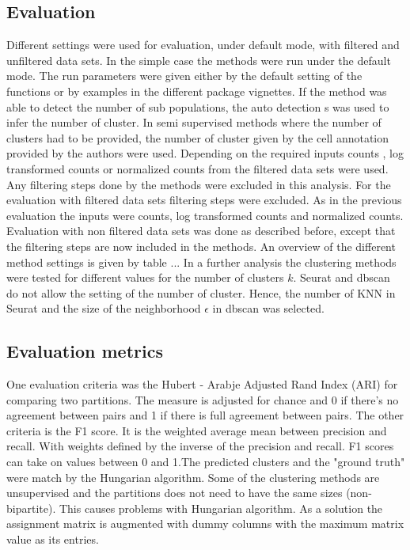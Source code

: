 \documentclass[11pt, a4paper]{article}\usepackage[]{graphicx}\usepackage[]{color}
\begin{document}
\subsection{Evaluation}
Different settings were used for evaluation, under default mode, with filtered and unfiltered data sets. 
In the  simple case the methods were run under the default mode. The run parameters were given either by the default setting of the functions or by examples in the different package vignettes. If the method was able to detect the number of sub populations, the auto detection s was used to infer the number of cluster. In semi supervised methods where the number of clusters had to be provided, the number of cluster given by the cell annotation provided by the authors were used. Depending on the required inputs counts , log transformed counts  or normalized counts  from the  filtered data sets were used. Any filtering steps done by the methods were excluded in this analysis.
For the evaluation with filtered data sets filtering steps were excluded. As in the previous evaluation the inputs were counts, log transformed counts and normalized counts. 
Evaluation with non filtered data sets was done as described before, except that the filtering steps are now included in the methods.
An overview of the different method settings is given by table ...
In a further analysis the clustering methods were tested for different values for the number of clusters $k$. Seurat and dbscan do not allow the setting of the number of cluster. Hence, the number of KNN in Seurat and the size of the neighborhood $\epsilon$ in dbscan was selected.
\subsection{Evaluation metrics}
One evaluation criteria was the Hubert - Arabje Adjusted Rand Index (ARI) for comparing two partitions. The measure is adjusted for chance and 0 if there's no agreement between pairs and 1 if there is full agreement between pairs. The other criteria is the F1 score. It is the weighted average mean between precision and recall. With weights defined by the inverse of the precision and recall. F1 scores can take on values between 0 and 1.The predicted clusters and the "ground truth" were match by the Hungarian algorithm. Some of the clustering methods are unsupervised and the partitions does not need to have the same sizes (non-bipartite). This causes problems with Hungarian algorithm. As a solution the assignment matrix is augmented with dummy columns with the maximum matrix value as its entries.
\end{document}
